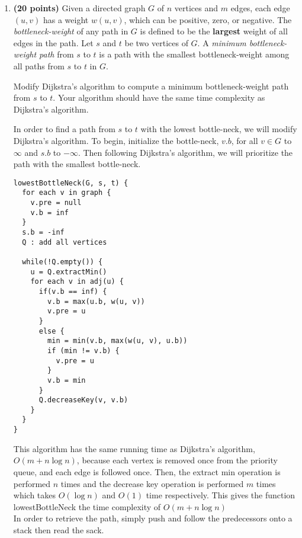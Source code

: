 \documentclass[11pt]{article}
\begin{document}
\begin{enumerate}

\item
{\bf (20 points)}
Given a directed graph $G$ of $n$ vertices and $m$ edges, each edge $(u,v)$ has a weight $w(u,v)$, which can be positive, zero, or negative.
The {\em bottleneck-weight} of any path in $G$ is defined to be the
{\bf largest} weight of all edges in the path. Let $s$ and $t$ be two vertices of $G$. A {\em minimum bottleneck-weight path} from $s$ to $t$ is a path with the smallest bottleneck-weight among all paths from $s$ to $t$ in $G$.

Modify Dijkstra's algorithm to compute a  minimum bottleneck-weight path from $s$ to $t$. Your algorithm should have the same time complexity as Dijkstra's algorithm.

\begin{tcolorbox}[breakable]

  In order to find a path from $s$ to $t$ with the lowest bottle-neck, we will
  modify Dijkstra's algorithm. To begin, initialize the bottle-neck, $v.b$, for all
  $v \in G$ to $\infty$ and $s.b$ to $-\infty$. Then following Dijkstra's algorithm,
  we will prioritize the path with the smallest bottle-neck.

\begin{lstlisting}
lowestBottleNeck(G, s, t) {
  for each v in graph {
    v.pre = null
    v.b = inf
  }
  s.b = -inf
  Q : add all vertices

  while(!Q.empty()) {
    u = Q.extractMin()
    for each v in adj(u) {
      if(v.b == inf) {
        v.b = max(u.b, w(u, v))
        v.pre = u
      }
      else {
        min = min(v.b, max(w(u, v), u.b))
        if (min != v.b) {
          v.pre = u
        }
        v.b = min
      }
      Q.decreaseKey(v, v.b)
    }
  }
}
\end{lstlisting}

This algorithm has the same running time as Dijkstra's algorithm, $O( m + n \log n)$, because
each vertex is removed once from the priority queue, and each edge is followed once. Then,
the extract min operation is performed $n$ times and the decrease key operation is
performed $m$ times which takes $O(\log n)$ and $O(1)$ time respectively. This gives
the function lowestBottleNeck the time complexity of $O(m + n \log n)$\\

In order to retrieve the path, simply push and follow the predecessors onto a stack
then read the sack.


\end{tcolorbox}
\end{enumerate}
\end{document}
